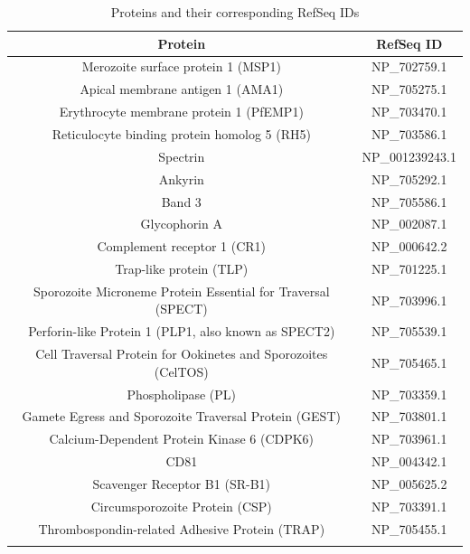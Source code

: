\documentclass[twoside]{article}
\begin{document}
\begin{longtable}{|c|c|}
    \hline
    \textbf{Protein} & \textbf{RefSeq ID} \\
    \hline
    Merozoite surface protein 1 (MSP1) & NP\_702759.1 \\
    Apical membrane antigen 1 (AMA1) & NP\_705275.1 \\
    Erythrocyte membrane protein 1 (PfEMP1) & NP\_703470.1 \\
    Reticulocyte binding protein homolog 5 (RH5) & NP\_703586.1 \\
    Spectrin & NP\_001239243.1 \\
    Ankyrin & NP\_705292.1 \\
    Band 3 & NP\_705586.1 \\
    Glycophorin A & NP\_002087.1 \\
    Complement receptor 1 (CR1) & NP\_000642.2 \\
    Trap-like protein (TLP) & NP\_701225.1 \\
    Sporozoite Microneme Protein Essential for Traversal (SPECT) & NP\_703996.1 \\
    Perforin-like Protein 1 (PLP1, also known as SPECT2) & NP\_705539.1 \\
    Cell Traversal Protein for Ookinetes and Sporozoites (CelTOS) & NP\_705465.1 \\
    Phospholipase (PL) & NP\_703359.1 \\
    Gamete Egress and Sporozoite Traversal Protein (GEST) & NP\_703801.1 \\
    Calcium-Dependent Protein Kinase 6 (CDPK6) & NP\_703961.1 \\
    CD81 & NP\_004342.1 \\
    Scavenger Receptor B1 (SR-B1) & NP\_005625.2 \\
    Circumsporozoite Protein (CSP) & NP\_703391.1 \\
    Thrombospondin-related Adhesive Protein (TRAP) & NP\_705455.1 \\
    \hline
    \caption{Proteins and their corresponding RefSeq IDs}
\end{longtable}
\end{document}
